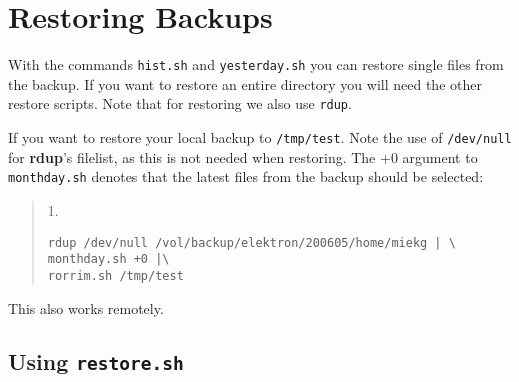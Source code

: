 \documentclass[a4paper, openany]{memoir}
\newcommand{\rdup}{\textbf{rdup}}
\newcommand{\cmd}[1]{\texttt{#1}}
\newcommand{\path}[1]{\texttt{#1}}
\begin{document}
\chapter{Restoring Backups}
With the commands \cmd{hist.sh} and \cmd{yesterday.sh} you can restore
single files from the backup. If you want to restore an entire directory
you will need the other restore scripts. Note that for restoring we
also use \cmd{rdup}.

\noindent If you want to restore your local backup to \path{/tmp/test}.
Note the use of \path{/dev/null} for \rdup's filelist, as this is not
needed when restoring. The +0 argument to \cmd{monthday.sh} denotes
that the latest files from the backup should be selected:
\begin{quote}
1.
\begin{verbatim}
rdup /dev/null /vol/backup/elektron/200605/home/miekg | \
monthday.sh +0 |\
rorrim.sh /tmp/test
\end{verbatim}
\end{quote}

This also works remotely.


\section{Using \cmd{restore.sh}}
\end{document}
